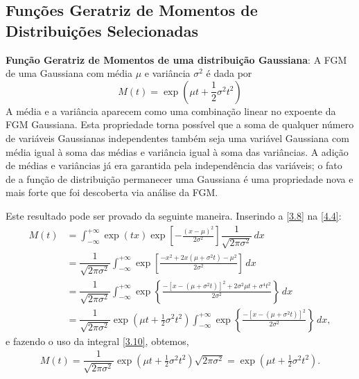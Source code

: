 \subsection{Funções Geratriz de Momentos de Distribuições Selecionadas}

\textbf{Função Geratriz de Momentos de uma distribuição Gaussiana}: A FGM de uma Gaussiana com média $ \mu $ e variância $ \sigma^2 $ é dada por
\begin{equation}
M(t) = \exp\left(\mu t + \frac{1}{2} \sigma^2 t^2\right)
\end{equation}
A média e a variância aparecem como uma combinação linear no expoente da FGM Gaussiana. Esta propriedade torna possível que a soma de qualquer número de variáveis Gaussianas independentes também seja uma variável Gaussiana com média igual à soma das médias e variância igual à soma das variâncias. A adição de médias e variâncias já era garantida pela independência das variáveis; o fato de a função de distribuição permanecer uma Gaussiana é uma propriedade nova e mais forte que foi descoberta via análise da FGM.

Este resultado pode ser provado da seguinte maneira. Inserindo a \autoref{3.8} na \autoref{4.4}:
\begin{align*}
M(t) &= \int_{-\infty}^{+\infty} \exp\left(t x\right) \exp\left[-\frac{(x-\mu)^2}{2\sigma^2}\right] \dfrac{1}{\sqrt{2\pi\sigma^2}} \, dx \\
&= \dfrac{1}{\sqrt{2\pi\sigma^2}}  \int_{-\infty}^{+\infty} \exp\left[\frac{-x^2 + 2x(\mu + \sigma^2 t) - \mu^2}{2\sigma^2}\right] \, dx \\
&= \dfrac{1}{\sqrt{2\pi\sigma^2}}  \int_{-\infty}^{+\infty} \exp\left\{\frac{-\left[x - (\mu + \sigma ^2 t)\right]^2 + 2\sigma^2 \mu t + \sigma^4 t^2}{2\sigma^2}\right\} \, dx \\
&= \dfrac{1}{\sqrt{2\pi\sigma^2}} \exp\left(\mu t + \frac{1}{2} \sigma^2 t^2\right) \int_{-\infty}^{+\infty} \exp\left\{\frac{-\left[x - (\mu + \sigma ^2 t)\right]^2}{2\sigma^2}\right\}\, dx,
\end{align*}
e fazendo o uso da integral \eqref{3.10}, obtemos,
\begin{align*}
M(t) = \dfrac{1}{\sqrt{2\pi\sigma^2}} \exp\left(\mu t + \frac{1}{2} \sigma^2 t^2\right) \sqrt{2\pi\sigma^2} = \exp\left(\mu t + \frac{1}{2} \sigma^2 t^2\right).
\end{align*}

